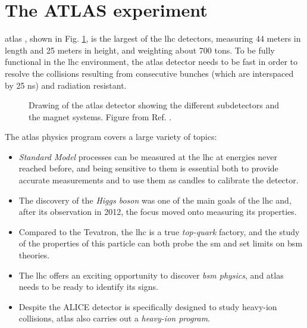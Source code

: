 
\section{The ATLAS experiment}
\label{sed:cern:atlas}

\gls{atlas} \cite{atlas:atlas}, shown in Fig. \ref{fig:atlas:atlas}, is the largest of the \gls{lhc} detectors, 
measuring 44 meters in length and 25 meters in height, and weighting about 700 tons. 
To be fully functional in the \gls{lhc} environment,  the \gls{atlas} detector needs to be fast in order to resolve the collisions resulting from consecutive bunches (which are interspaced by 25 ns) and radiation resistant. 

\begin{figure}[ht]
\centering
{}
\caption{Drawing of the \gls{atlas} detector showing the different subdetectors and
the magnet systems. Figure from Ref. \cite{atlas:atlas}.}
\label{fig:atlas:atlas}
\end{figure}

The \gls{atlas} physics program covers a large variety of topics: 
\begin{itemize}
\item \textit{Standard Model} processes can be measured at the \gls{lhc} at energies never reached before, and being sensitive to them is essential both to provide accurate measurements and to use them as candles to calibrate the detector. 
\item The discovery of the \textit{Higgs boson} was one of the main goals of the \gls{lhc} and, after its observation in 2012, the focus moved onto measuring its properties. 
\item Compared to the Tevatron, the \gls{lhc} is a true \textit{top-quark} factory, 
and the study of the properties of this particle can both probe the \gls{sm} and set limits on \gls{bsm} theories.
\item The \gls{lhc} offers an exciting opportunity to discover \textit{\gls{bsm} physics}, and \gls{atlas} needs to be ready to identify its signs.
\item Despite the ALICE detector is specifically designed to study heavy-ion collisions, \gls{atlas} also carries out a \textit{heavy-ion program}.
\end{itemize}

